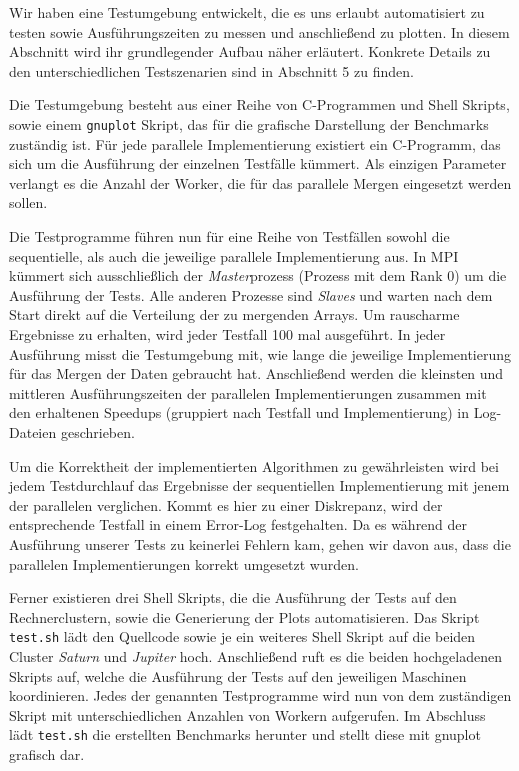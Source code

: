 Wir haben eine Testumgebung entwickelt, die es uns erlaubt automatisiert zu testen sowie Ausführungszeiten zu messen und anschließend zu plotten.
In diesem Abschnitt wird ihr grundlegender Aufbau näher erläutert.
Konkrete Details zu den unterschiedlichen Testszenarien sind in Abschnitt 5 zu finden.

Die Testumgebung besteht aus einer Reihe von C-Programmen und Shell Skripts, sowie einem \texttt{gnuplot} Skript, das für die grafische Darstellung der Benchmarks zuständig ist.
Für jede parallele Implementierung existiert ein C-Programm, das sich um die Ausführung der einzelnen Testfälle kümmert.
Als einzigen Parameter verlangt es die Anzahl der Worker, die für das parallele Mergen eingesetzt werden sollen.

Die Testprogramme führen nun für eine Reihe von Testfällen sowohl die sequentielle, als auch die jeweilige parallele Implementierung aus.
In MPI kümmert sich ausschließlich der \emph{Master}prozess (Prozess mit dem Rank 0) um die Ausführung der Tests.
Alle anderen Prozesse sind \emph{Slaves} und warten nach dem Start direkt auf die Verteilung der zu mergenden Arrays.
Um rauscharme Ergebnisse zu erhalten, wird jeder Testfall 100 mal ausgeführt.
In jeder Ausführung misst die Testumgebung mit, wie lange die jeweilige Implementierung für das Mergen der Daten gebraucht hat.
Anschließend werden die kleinsten und mittleren Ausführungszeiten der parallelen Implementierungen zusammen mit den erhaltenen Speedups (gruppiert nach Testfall und Implementierung) in Log-Dateien geschrieben.

Um die Korrektheit der implementierten Algorithmen zu gewährleisten wird bei jedem Testdurchlauf das Ergebnisse der sequentiellen Implementierung mit jenem der parallelen verglichen.
Kommt es hier zu einer Diskrepanz, wird der entsprechende Testfall in einem Error-Log festgehalten.
Da es während der Ausführung unserer Tests zu keinerlei Fehlern kam, gehen wir davon aus, dass die parallelen Implementierungen korrekt umgesetzt wurden.

Ferner existieren drei Shell Skripts, die die Ausführung der Tests auf den Rechnerclustern, sowie die Generierung der Plots automatisieren.
Das Skript \texttt{test.sh} lädt den Quellcode sowie je ein weiteres Shell Skript auf die beiden Cluster \emph{Saturn} und \emph{Jupiter} hoch.
Anschließend ruft es die beiden hochgeladenen Skripts auf, welche die Ausführung der Tests auf den jeweiligen Maschinen koordinieren.
Jedes der genannten Testprogramme wird nun von dem zuständigen Skript mit unterschiedlichen Anzahlen von Workern aufgerufen.
Im Abschluss lädt \texttt{test.sh} die erstellten Benchmarks herunter und stellt diese mit gnuplot grafisch dar.